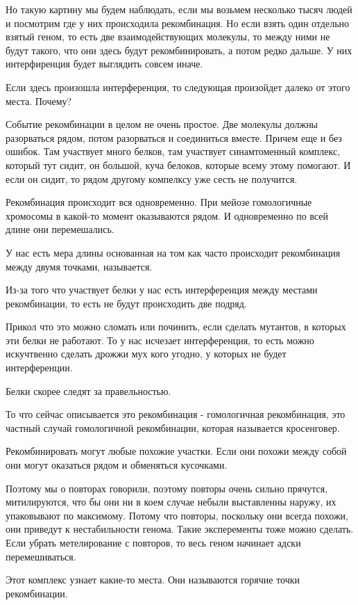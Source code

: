 Но такую картину мы будем наблюдать, если 
мы возьмем несколько тысяч людей и посмотрим где 
у них происходила рекомбинация. Но если взять 
один отдельно взятый геном, то есть две 
взаимодействующих молекулы, то между ними не будут такого, что 
они здесь будут рекомбинировать, 
а потом редко дальше. У них интерфиренция 
будет выглядить совсем иначе. 

Если здесь произошла интерференция, то 
следующая произойдет далеко от этого места. Почему? 

Событие рекомбинации в целом не очень простое. 
Две молекулы должны разорваться рядом, потом 
разорваться и соединиться вместе. Причем еще и без
ошибок. 
Там участвует много белков, там участвует синамтоменный
комплекс, который тут сидит, он большой, 
куча белоков, 
которые всему этому помогают. И если он сидит, то 
рядом другому компелксу уже сесть не получится. 

Рекомбинация происходит вся одновременно. При мейозе 
гомологичные хромосомы в какой-то момент оказываются рядом. 
И одновременно по всей длине они перемешались. 

У нас есть мера длины основанная на том как часто происходит 
рекомбинация между двумя точками, называется. 

Из-за того что участвует белки у нас есть интерференция между 
местами рекомбинации, то есть не будут происходить две подряд. 

Прикол что это можно сломать или починить, если 
сделать мутантов, в которых 
эти белки не работают. То у нас исчезает 
интерференция, то есть можно 
искучтвенно сделать дрожжи мух кого угодно, 
у которых не будет интерференции. 

Белки скорее следят за правельностью.

То что сейчас описывается это рекомбинация - гомологичная 
рекомбинация, это частный случай гомологичной рекомбинации, 
которая называется кросенговер. 

Рекомбинировать могут любые похожие участки. Если они 
похожи между собой они могут оказаться рядом и обменяться кусочками. 

Поэтому мы о повторах говорили, поэтому повторы очень сильно прячутся, 
митилируются, что бы они ни в коем случае небыли выставленны наружу, 
их упаковывают по максимому. Потому что повторы, поскольку 
они всегда похожи, 
они приведут к нестабильности генома. Такие эксперементы тоже 
можно сделать. Если убрать метелирование с повторов, то 
весь геном начинает адски перемешиваться. 

Этот комплекс узнает какие-то места. Они называются 
горячие точки рекомбинации. 

